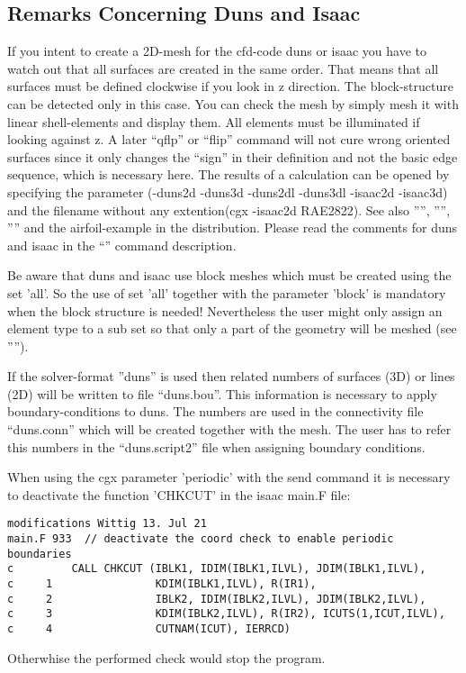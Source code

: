 \documentclass{article}
\begin{document}
\begin{appendix}
\subsection{\label{Remarks Concerning Duns and Isaac}Remarks Concerning Duns and Isaac}
If you intent to create a 2D-mesh for the cfd-code duns or isaac you have to watch out that all surfaces are created in the same order. That means that all surfaces must be defined clockwise if you look in z direction. The block-structure can be detected only in this case. You can check the mesh by simply mesh it with linear shell-elements and display them. All elements must be illuminated if looking against z. A later ``qflp'' or ``flip'' command will not cure wrong oriented surfaces since it only changes the ``sign'' in their definition and not the basic edge sequence, which is necessary here. The results of a calculation can be opened by specifying the parameter (-duns2d -duns3d -duns2dl -duns3dl -isaac2d -isaac3d) and the filename without any extention(cgx -isaac2d RAE2822). See also '''', '''', '''' and the airfoil-example in the distribution. Please read the comments for duns and isaac in the ``'' command description. 

Be aware that duns and isaac use block meshes which must be created using the set 'all'. So the use of set 'all' together with the parameter 'block' is mandatory when the block structure is needed! Nevertheless the user might only assign an element type to a sub set so that only a part of the geometry will be meshed (see '''').

If the solver-format ''duns'' is used then related numbers of surfaces (3D) or lines (2D) will be written to file ``duns.bou''. This information is necessary to apply boundary-conditions to duns. The numbers are used in the connectivity file ``duns.conn'' which will be created together with the mesh. The user has to refer this numbers in the ``duns.script2'' file when assigning boundary conditions.

When using the cgx parameter 'periodic' with the send command it is necessary to deactivate the function 'CHKCUT' in the isaac main.F file:
\begin{verbatim}
modifications Wittig 13. Jul 21
main.F 933  // deactivate the coord check to enable periodic boundaries
c         CALL CHKCUT (IBLK1, IDIM(IBLK1,ILVL), JDIM(IBLK1,ILVL), 
c     1                KDIM(IBLK1,ILVL), R(IR1),
c     2                IBLK2, IDIM(IBLK2,ILVL), JDIM(IBLK2,ILVL), 
c     3                KDIM(IBLK2,ILVL), R(IR2), ICUTS(1,ICUT,ILVL),
c     4                CUTNAM(ICUT), IERRCD)
\end{verbatim}
Otherwhise the performed check would stop the program.


\end{appendix}
\end{document}
